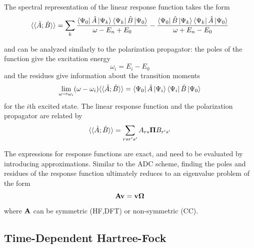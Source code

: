 The spectral representation of the linear response function takes the form
\begin{equation}
\langle\langle \hat{A}; \hat{B}
\rangle\rangle = \sum_k \frac{
	\bra{\smash{\Psi_0}}\hat{A}\ket{\smash{\Psi_k}} \bra{\smash{\Psi_k}} \hat{B} \ket{\smash{\Psi_0}}
}{
	\omega - E_n + E_0
} - \frac{ 
	\bra{\smash{\Psi_0}}\hat{B}\ket{\smash{\Psi_k}} \bra{\smash{\Psi_k}} \hat{A} \ket{\smash{\Psi_0}}
}{
	\omega + E_n - E_0
}
\end{equation}

\noindent and can be analyzed similarly to the polarization propagator: the poles of the function give the excitation energy
\begin{equation}
\omega_i = E_i - E_0
\end{equation}
and the residues give information about the transition moments 
\begin{equation}
\lim_{\omega \rightarrow  \omega_i} (\omega - \omega_i) \langle\langle \hat{A}; \hat{B} \rangle \rangle = \bra{\smash{\Psi_0}}\hat{A}\ket{\smash{\Psi_i}} \bra{\smash{\Psi_i}} \hat{B} \ket{\smash{\Psi_0}}
\end{equation}
for the $i$th excited state. The linear response function and the polarization propagator are related by \cite{Sch2018}
\begin{equation}
\langle\langle \hat{A}; \hat{B}
\rangle\rangle = \sum_{rsr's'} A_{rs} \mathbf{\Pi} B_{r's'}
\end{equation}

The expressions for response functions are exact, and need to be evaluated by introducing approximations. Similar to the ADC scheme, finding the poles and residues of the response function ultimately reduces to an eigenvalue problem of the form
\begin{equation}
\mathbf{A}\mathbf{v} = \mathbf{v}\mathbf{\Omega}
\end{equation}
\noindent where $\mathbf{A}$ can be symmetric (HF,DFT) or non-symmetric (CC).

\subsection{Time-Dependent Hartree-Fock}

